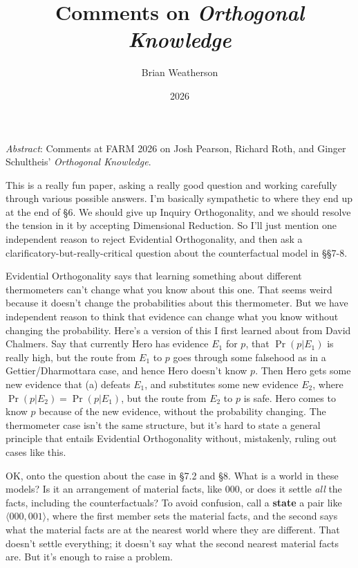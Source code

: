 \documentclass[
  11pt,
  letterpaper,
  DIV=11,
  numbers=noendperiod,
  twoside]{scrartcl}
\title{Comments on \emph{Orthogonal Knowledge}}
\author{Brian Weatherson}
\date{2026}
\renewenvironment{abstract}
 {\vspace{-1.25cm}
 \quotation\small\noindent\emph{Abstract}:}
 {\endquotation}
\renewenvironment{abstract}
 {\quotation\small\noindent\emph{Abstract}:}
 {\endquotation\vspace{-0.02cm}}
\begin{document}
\maketitle
\begin{abstract}
Comments at FARM 2026 on Josh Pearson, Richard Roth, and Ginger
Schultheis' \emph{Orthogonal Knowledge}.
\end{abstract}


This is a really fun paper, asking a really good question and working
carefully through various possible answers. I'm basically sympathetic to
where they end up at the end of §6. We should give up Inquiry
Orthogonality, and we should resolve the tension in it by accepting
Dimensional Reduction. So I'll just mention one independent reason to
reject Evidential Orthogonality, and then ask a
clarificatory-but-really-critical question about the counterfactual
model in §§7-8.

Evidential Orthogonality says that learning something about different
thermometers can't change what you know about this one. That seems weird
because it doesn't change the probabilities about this thermometer. But
we have independent reason to think that evidence can change what you
know without changing the probability. Here's a version of this I first
learned about from David Chalmers. Say that currently Hero has evidence
\(E_1\) for \(p\), that \(\Pr(p | E_1)\) is really high, but the route
from \(E_1\) to \(p\) goes through some falsehood as in a
Gettier/Dharmottara case, and hence Hero doesn't know \(p\). Then Hero
gets some new evidence that (a) defeats \(E_1\), and substitutes some
new evidence \(E_2\), where \(\Pr(p | E_2) = \Pr(p | E_1)\), but the
route from \(E_2\) to \(p\) is safe. Hero comes to know \(p\) because of
the new evidence, without the probability changing. The thermometer case
isn't the same structure, but it's hard to state a general principle
that entails Evidential Orthogonality without, mistakenly, ruling out
cases like this.

OK, onto the question about the case in §7.2 and §8. What is a world in
these models? Is it an arrangement of material facts, like 000, or does
it settle \emph{all} the facts, including the counterfactuals? To avoid
confusion, call a \textbf{state} a pair like
\(\langle 000, 001\rangle\), where the first member sets the material
facts, and the second says what the material facts are at the nearest
world where they are different. That doesn't settle everything; it
doesn't say what the second nearest material facts are. But it's enough
to raise a problem.
\end{document}
